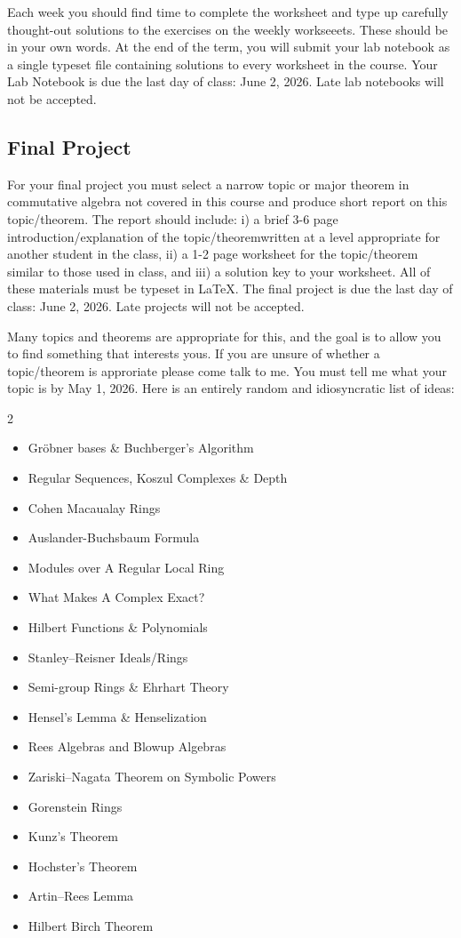 \documentclass[11pt,letterpaper]{article}
\begin{document}
Each week you should find time to complete the worksheet and type up carefully thought-out solutions to the exercises on the weekly workseeets. These should be in your own words. At the end of the term, you will submit your lab notebook as a single typeset file containing solutions to every worksheet in the course. Your Lab Notebook is due the last day of class: June 2, 2026. Late lab notebooks will not be accepted.

\subsection*{Final Project}

For your final project you must select a narrow topic or major theorem in commutative algebra not covered in this course and produce short report on this topic/theorem. The report should include: i) a brief 3-6 page introduction/explanation of the topic/theoremwritten at a level appropriate for another student in the class, ii) a 1-2 page worksheet for the topic/theorem similar to those used in class, and iii) a solution key to your worksheet. All of these materials must be typeset in LaTeX. The final project is due the last day of class: June 2, 2026. Late projects will not be accepted.

Many topics and theorems are appropriate for this, and the goal is to allow you to find something that interests yous. If you are unsure of whether a topic/theorem is approriate please come talk to me. You must tell me what your topic is by May 1, 2026. Here is an entirely random and idiosyncratic list of ideas:

\setlength{\columnsep}{24pt}\setlength{\multicolsep}{3pt}
\begin{multicols}{2}
\fontsize{10}{12.5}\selectfont
\begin{itemize}
\item Gröbner bases \& Buchberger's Algorithm
\item Regular Sequences, Koszul Complexes \& Depth
\item Cohen Macaualay Rings
\item Auslander-Buchsbaum Formula
\item Modules over A Regular Local Ring
\item What Makes A Complex Exact?
\item Hilbert Functions \& Polynomials
\item Stanley--Reisner Ideals/Rings
\item Semi-group Rings \& Ehrhart Theory
\item Hensel's Lemma \& Henselization
\item Rees Algebras and Blowup Algebras
\item Zariski--Nagata Theorem on Symbolic Powers
\item Gorenstein Rings
\item Kunz's Theorem
\item Hochster's Theorem
\item Artin--Rees Lemma
\item Hilbert Birch Theorem
\end{itemize}
\end{multicols}
\end{document}
